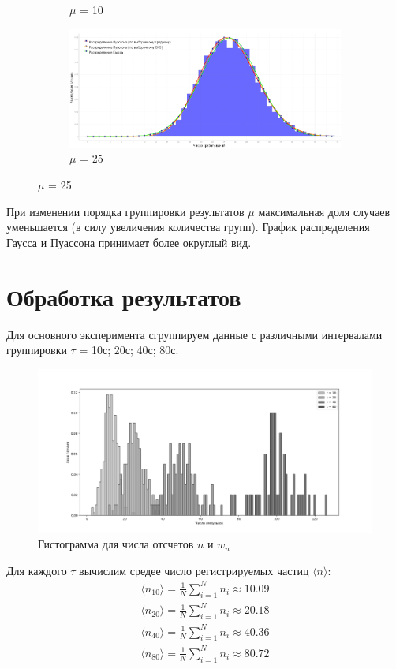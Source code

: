 \documentclass[a4paper, 12pt]{article}
\begin{document}
\begin{figure}[H]
\begin{subfigure}{.25\textwidth}
    \caption{$\mu$ = 10}
\end{subfigure}%
\begin{subfigure}{.25\textwidth}
    \centering
    \includegraphics[width=1\linewidth]{m_25}
    \caption{$\mu$ = 25}
\end{subfigure}
\end{figure}

При изменении порядка группировки результатов $\mu$ максимальная доля случаев уменьшается (в силу увеличения количества групп). График распределения Гаусса и Пуассона принимает более округлый вид.

\section*{Обработка результатов}
Для основного эксперимента сгруппируем данные с различными интервалами группировки $\tau$ = 10с; 20с; 40с; 80с.

\begin{figure}[H]
\centering
\includegraphics[width=1\linewidth]{images/Figure_1.png}
\caption{Гистограмма для числа отсчетов $n$ и $w_{n}$}
\end{figure}

Для каждого $\tau$ вычислим средее число регистрируемых частиц $\langle n \rangle$:
\begin{equation*}
  \begin{aligned}
    \langle n_{10} \rangle = \frac{1}{N}\sum_{i=1}^{N} {n_i} \approx 10.09\\    
    \langle n_{20} \rangle = \frac{1}{N}\sum_{i=1}^{N} {n_i} \approx 20.18\\
    \langle n_{40} \rangle = \frac{1}{N}\sum_{i=1}^{N} {n_i} \approx 40.36\\
    \langle n_{80} \rangle = \frac{1}{N}\sum_{i=1}^{N} {n_i} \approx 80.72
  \end{aligned}
\end{equation*}
\end{document}
